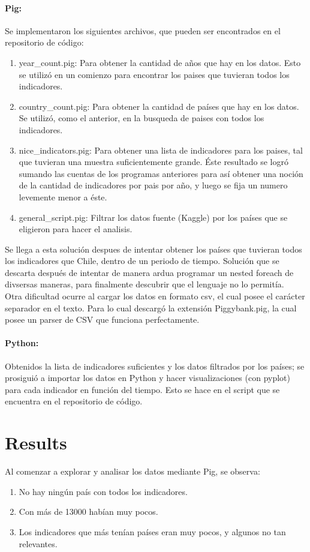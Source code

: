 \documentclass{article}
\begin{document}
\paragraph{Pig:}
Se implementaron los siguientes archivos, que pueden ser encontrados en el repositorio de código:
\begin{enumerate}
	\item year\_count.pig: Para obtener la cantidad de años que hay en los datos. Esto se utilizó en un comienzo para encontrar los paises que tuvieran todos los indicadores. 
	\item country\_count.pig: Para obtener la cantidad de países que hay en los datos. Se utilizó, como el anterior, en la busqueda de paises con todos los indicadores.
	\item nice\_indicators.pig: Para obtener una lista de indicadores para los paises, tal que tuvieran una muestra suficientemente grande. Éste resultado se logró sumando las cuentas de los programas anteriores para así obtener una noción de la cantidad de indicadores por pais por año, y luego se fija un numero levemente menor a éste.
	\item general\_script.pig: Filtrar los datos fuente (Kaggle) por los países que se eligieron para hacer el analisis.
\end{enumerate}
Se llega a esta solución despues de intentar obtener los países que tuvieran todos los indicadores que Chile, dentro de un periodo de tiempo. Solución que se descarta después de intentar de manera ardua programar un nested foreach de divsersas maneras, para finalmente descubrir que el lenguaje no lo permitía.\\

Otra dificultad ocurre al cargar los datos en formato csv, el cual posee el carácter separador en el texto. Para lo cual descargó la extensión Piggybank.pig, la cual posee un parser de CSV que funciona perfectamente.\\
\paragraph{Python:}
Obtenidos la lista de indicadores suficientes y los datos filtrados por los países; se prosiguió a importar los datos en Python y hacer visualizaciones (con pyplot) para cada indicador en función del tiempo. Esto se hace en el script que se encuentra en el repositorio de código.
\section{Results}
Al comenzar a explorar y analisar los datos mediante Pig, se observa:
\begin{enumerate}
	\item No hay ningún país con todos los indicadores.
	\item Con más de 13000 habían muy pocos.
	\item Los indicadores que más tenían países eran muy pocos, y algunos no tan relevantes.
\end{enumerate}
\end{document}
